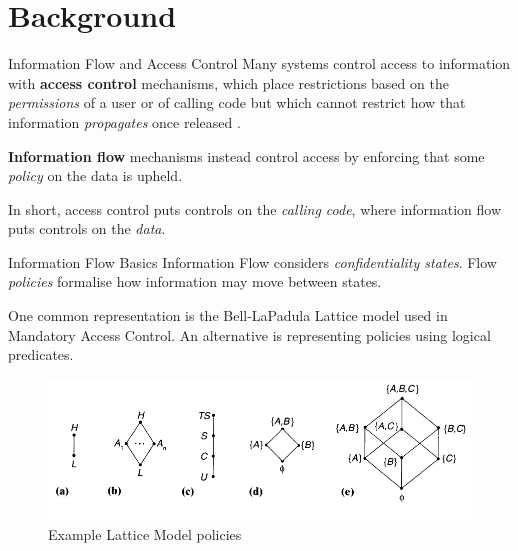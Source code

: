\section{Background}

\begin{frame}{Information Flow and Access Control}
	Many systems control access to information with \textbf{access control} mechanisms, which place restrictions based on the \textit{permissions} of a user or of calling code but which cannot restrict how that information \textit{propagates} once released \cite{ifbackground:sabelfeld}.
	
	\textbf{Information flow} mechanisms instead control access by enforcing that some \textit{policy} on the data is upheld.
	
	In short, access control puts controls on the \textit{calling code}, where information flow puts controls on the \textit{data}.
\end{frame}

\begin{frame}{Information Flow Basics}
	Information Flow considers \textit{confidentiality states}. Flow \textit{policies} formalise how information may move between states.
	
	One common representation is the Bell-LaPadula Lattice model used in Mandatory Access Control. An alternative is representing policies using logical predicates.
	
	\begin{figure}
		\includegraphics[scale=0.45]{content/images/lattice_examples.png}
		\caption{Example Lattice Model policies \cite{ifbackground:sandhu}}
	\end{figure}
	
\end{frame}

